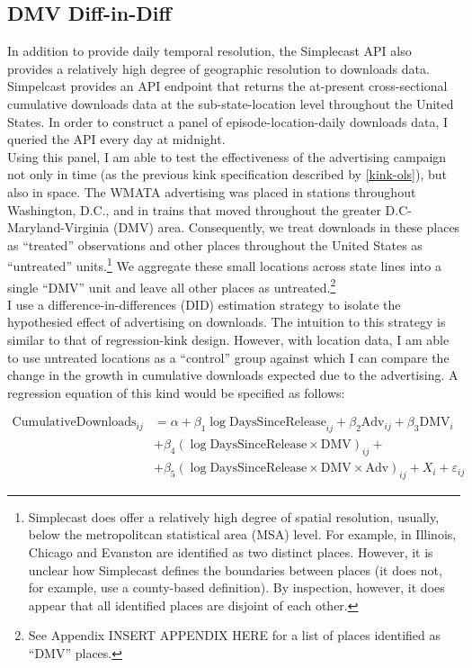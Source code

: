 \documentclass[11pt, letterpaper, twoside]{article}
\begin{document}
\subsection{DMV Diff-in-Diff}
In addition to provide daily temporal resolution, the Simplecast API also provides a relatively high degree of geographic resolution to downloads data. Simpelcast provides an API endpoint that returns the at-present cross-sectional cumulative downloads data at the sub-state-location level throughout the United States. In order to construct a panel of episode-location-daily downloads data, I queried the API every day at midnight.\\

Using this panel, I am able to test the effectiveness of the advertising campaign not only in time (as the previous kink specification described by \eqref{kink-ols}), but also in space. The WMATA advertising was placed in stations throughout Washington, D.C., and in trains that moved throughout the greater D.C-Maryland-Virginia (DMV) area. Consequently, we treat downloads in these places as ``treated'' observations and other places throughout the United States as ``untreated'' units.\footnote{Simplecast does offer a relatively high degree of spatial resolution, usually, below the metropolitcan statistical area (MSA) level. For example, in Illinois, Chicago and Evanston are identified as two distinct places. However, it is unclear how Simplecast defines the boundaries between places (it does not, for example, use a county-based definition). By inspection, however, it does appear that all identified places are disjoint of each other.} We aggregate these small locations across state lines into a single ``DMV'' unit and leave all other places as untreated.\footnote{See Appendix INSERT APPENDIX HERE for a list of places identified as ``DMV'' places.}\\

I use a difference-in-differences (DID) estimation strategy to isolate the hypothesied effect of advertising on downloads. The intuition to this strategy is similar to that of regression-kink design. However, with location data, I am able to use untreated locations as a ``control'' group against which I can compare the change in the growth in cumulative downloads expected due to the advertising. A regression equation of this kind would be specified as follows:

\begin{align}
  \label{dmv-did}
  \text{CumulativeDownloads}_{ij} &= \alpha + \beta_1 \log \text{DaysSinceRelease}_{ij} + \beta_2 \text{Adv}_{ij} + \beta_3 \text{DMV}_i \\ \nonumber
    &+ \beta_4(\log \text{DaysSinceRelease} \times \text{DMV})_{ij} + \\ \nonumber
    &+ \beta_5(\log \text{DaysSinceRelease} \times \text{DMV} \times \text{Adv})_{ij} + X_i + \varepsilon_{ij} 
\end{align}
\end{document}

